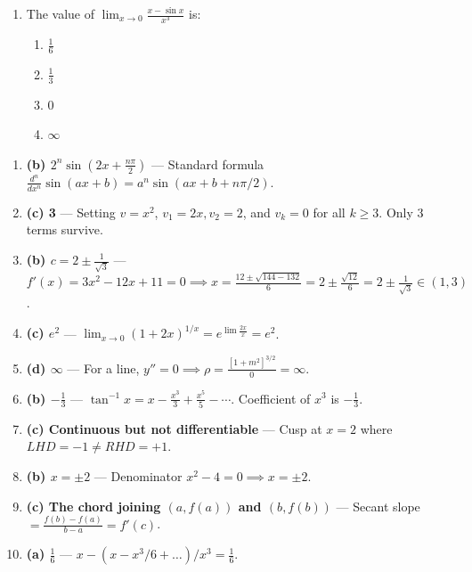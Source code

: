 \begin{enumerate}[leftmargin=1.5em]
    \item The value of $\lim_{x\to 0} \frac{x - \sin x}{x^3}$ is:
    \begin{enumerate}[label=(\alph*)]
        \item $\frac{1}{6}$
        \item $\frac{1}{3}$
        \item 0
        \item $\infty$
    \end{enumerate}
\end{enumerate}

\begin{solutionbox}
\begin{enumerate}
    \item \textbf{(b) $2^n \sin\left(2x + \frac{n\pi}{2}\right)$} --- Standard formula $\frac{d^n}{dx^n}\sin(ax+b) = a^n \sin(ax+b+n\pi/2)$.
    \item \textbf{(c) 3} --- Setting $v = x^2$, $v_1 = 2x, v_2 = 2$, and $v_k = 0$ for all $k \ge 3$. Only 3 terms survive.
    \item \textbf{(b) $c = 2 \pm \frac{1}{\sqrt{3}}$} --- $f'(x) = 3x^2 - 12x + 11 = 0 \implies x = \frac{12 \pm \sqrt{144-132}}{6} = 2 \pm \frac{\sqrt{12}}{6} = 2 \pm \frac{1}{\sqrt{3}} \in (1,3)$.
    \item \textbf{(c) $e^2$} --- $\lim_{x\to 0}(1+2x)^{1/x} = e^{\lim \frac{2x}{x}} = e^2$.
    \item \textbf{(d) $\infty$} --- For a line, $y'' = 0 \implies \rho = \frac{[1+m^2]^{3/2}}{0} = \infty$.
    \item \textbf{(b) $-\frac{1}{3}$} --- $\tan^{-1}x = x - \frac{x^3}{3} + \frac{x^5}{5} - \cdots$. Coefficient of $x^3$ is $-\frac{1}{3}$.
    \item \textbf{(c) Continuous but not differentiable} --- Cusp at $x=2$ where $LHD = -1 \ne RHD = +1$.
    \item \textbf{(b) $x = \pm 2$} --- Denominator $x^2 - 4 = 0 \implies x = \pm 2$.
    \item \textbf{(c) The chord joining $(a, f(a))$ and $(b, f(b))$} --- Secant slope $= \frac{f(b)-f(a)}{b-a} = f'(c)$.
    \item \textbf{(a) $\frac{1}{6}$} --- $x - (x - x^3/6 + \dots) / x^3 = \frac{1}{6}$.
\end{enumerate}
\end{solutionbox}

